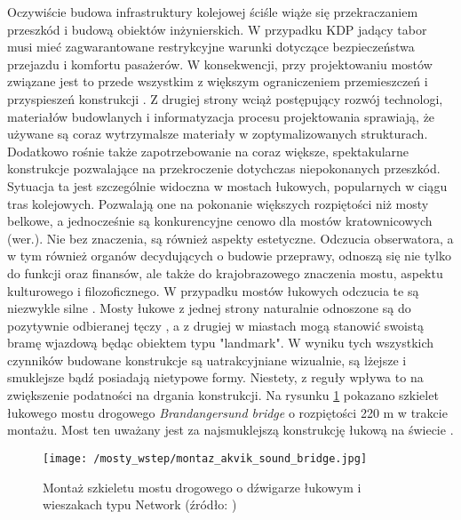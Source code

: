 Oczywiście budowa infrastruktury kolejowej ściśle wiąże się przekraczaniem przeszkód i budową obiektów inżynierskich. W przypadku KDP jadący tabor musi mieć zagwarantowane restrykcyjne warunki dotyczące bezpieczeństwa przejazdu i komfortu pasażerów. W konsekwencji, przy projektowaniu mostów związane jest to przede wszystkim z większym ograniczeniem przemieszczeń i przyspieszeń konstrukcji \parencite{Niemierko}. Z drugiej strony wciąż postępujący rozwój technologi, materiałów budowlanych i informatyzacja procesu projektowania sprawiają, że używane są coraz wytrzymalsze materiały w zoptymalizowanych strukturach. Dodatkowo rośnie także zapotrzebowanie na coraz większe, spektakularne konstrukcje pozwalające na przekroczenie dotychczas niepokonanych przeszkód. Sytuacja ta jest szczególnie widoczna w mostach łukowych, popularnych w ciągu tras kolejowych. Pozwalają one na pokonanie większych rozpiętości niż mosty belkowe, a jednocześnie są konkurencyjne cenowo dla mostów kratownicowych (wer.). Nie bez znaczenia, są również aspekty estetyczne. Odczucia obserwatora, a w tym również organów decydujących o budowie przeprawy, odnoszą się nie tylko do funkcji oraz finansów, ale także do krajobrazowego znaczenia mostu, aspektu kulturowego i filozoficznego. W przypadku mostów łukowych odczucia te są niezwykle silne \parencite{Kido_Cywiński_2019,Kido_Cywiński_2021}. Mosty łukowe z jednej strony naturalnie odnoszone są do pozytywnie odbieranej tęczy \parencite{Prandowski1994}, a z drugiej w miastach mogą stanowić swoistą bramę wjazdową będąc obiektem typu "landmark". W wyniku tych wszystkich czynników budowane konstrukcje są uatrakcyjniane wizualnie, są lżejsze i smuklejsze bądź posiadają nietypowe formy. Niestety, z reguły wpływa to na zwiększenie podatności na drgania konstrukcji. Na rysunku \ref{fig:bridges_arch_monatage} pokazano szkielet łukowego mostu drogowego \textit{Brandangersund bridge} o rozpiętości 220 m w trakcie montażu. Most ten uważany jest za najsmuklejszą konstrukcję łukową na świecie \parencite{Larssen2011}.

\begin{figure}[hbt!]
	\centering
	\texttt{[image: /mosty\_wstep/montaz\_akvik\_sound\_bridge.jpg]}
	\captionsetup{justification=centering}
	\caption{Montaż szkieletu mostu drogowego o dźwigarze łukowym i wieszakach typu Network (źródło: \parencite{Tveit2014})}
	\label{fig:bridges_arch_monatage}
\end{figure}

